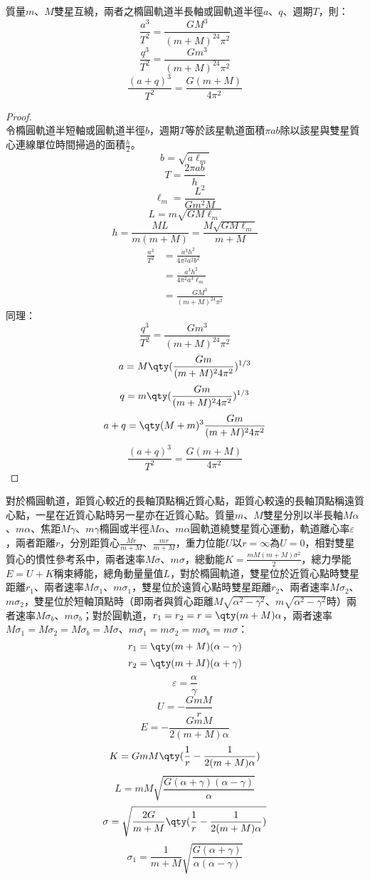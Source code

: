 \documentclass[a4paper,12pt]{article}
\begin{document}
質量$m$、$M$雙星互繞，兩者之橢圓軌道半長軸或圓軌道半徑$a$、$q$、週期$T$，則：
\[\frac{a^3}{T^2}=\frac{GM^3}{(m+M)^24\pi^2}\]
\[\frac{q^3}{T^2}=\frac{Gm^3}{(m+M)^24\pi^2}\]
\[\frac{(a+q)^3}{T^2}=\frac{G(m+M)}{4\pi^2}\]
\begin{proof}\mbox{}\\
令橢圓軌道半短軸或圓軌道半徑$b$，週期$T$等於該星軌道面積$\pi ab$除以該星與雙星質心連線單位時間掃過的面積$\frac{h}{2}$。
\[b=\sqrt{a\ell_m}\]
\[T=\frac{2\pi ab}{h}\]
\[\ell_m=\frac{L^2}{Gm^2M}\]
\[L=m\sqrt{GM\ell_m}\]
\[h=\frac{ML}{m(m+M)}=\frac{M\sqrt{GM\ell_m}}{m+M}\]
\[\begin{aligned}
\frac{a^3}{T^2}&=\frac{a^3h^2}{4\pi^2 a^2b^2}\\
&=\frac{a^3h^2}{4\pi^2a^3\ell_m}\\
&=\frac{GM^3}{(m+M)^24\pi^2}
\end{aligned}\]
同理：
\[\frac{q^3}{T^2}=\frac{Gm^3}{(m+M)^24\pi^2}\]
\[a=M\qty(\frac{Gm}{(m+M)^24\pi^2})^{1/3}\]
\[q=m\qty(\frac{Gm}{(m+M)^24\pi^2})^{1/3}\]
\[a+q=\qty(M+m)^3\frac{Gm}{(m+M)^24\pi^2}\]
\[\frac{(a+q)^3}{T^2}=\frac{G(m+M)}{4\pi^2}\]
\end{proof}
對於橢圓軌道，距質心較近的長軸頂點稱近質心點，距質心較遠的長軸頂點稱遠質心點，一星在近質心點時另一星亦在近質心點。質量$m$、$M$雙星分別以半長軸$M\alpha$、$m\alpha$、焦距$M\gamma$、$m\gamma$橢圓或半徑$M\alpha$、$m\alpha$圓軌道繞雙星質心運動，軌道離心率$\varepsilon$，兩者距離$r$，分別距質心$\frac{Mr}{m+M}$、$\frac{mr}{m+M}$，重力位能$U$以$r=\infty$為$U=0$，相對雙星質心的慣性參考系中，兩者速率$M\sigma$、$m\sigma$，總動能$K=\frac{mM(m+M)\sigma^2}{2}$，總力學能$E=U+K$稱束縛能，總角動量量值$L$，對於橢圓軌道，雙星位於近質心點時雙星距離$r_1$、兩者速率$M\sigma_1$、$m\sigma_1$，雙星位於遠質心點時雙星距離$r_2$、兩者速率$M\sigma_2$、$m\sigma_2$，雙星位於短軸頂點時（即兩者與質心距離$M\sqrt{\alpha^2-\gamma^2}$、$m\sqrt{\alpha^2-\gamma^2}$時）兩者速率$M\sigma_b$、$m\sigma_b$；對於圓軌道，$r_1=r_2=r=\qty(m+M)\alpha$，兩者速率$M\sigma_1=M\sigma_2=M\sigma_b=M\sigma$、$m\sigma_1=m\sigma_2=m\sigma_b=m\sigma$：
\[r_1=\qty(m+M)(\alpha-\gamma)\]
\[r_2=\qty(m+M)(\alpha+\gamma)\]
\[\varepsilon=\frac{\alpha}{\gamma}\]
\[U=-\frac{GmM}{r}\]
\[E=-\frac{GmM}{2(m+M)\alpha}\]
\[K=GmM\qty(\frac{1}{r}-\frac{1}{2(m+M)\alpha})\]
\[L=mM\sqrt{\frac{G(\alpha+\gamma)(\alpha-\gamma)}{\alpha}}\]
\[\sigma=\sqrt{\frac{2G}{m+M}\qty(\frac{1}{r}-\frac{1}{2(m+M)\alpha})}\]
\[\sigma_1=\frac{1}{m+M}\sqrt{\frac{G(\alpha+\gamma)}{\alpha(\alpha-\gamma)}}\]
\end{document}
